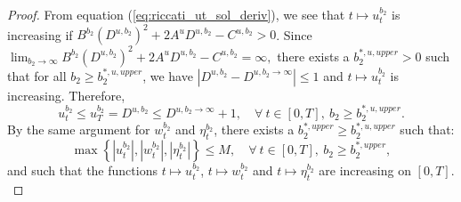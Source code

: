 \documentclass[11pt]{article}
\begin{document}
\begin{proof}
	From equation (\ref{eq:riccati_ut_sol_deriv}), we see that $t \mapsto u_t^{b_2}$ is increasing if $B^{b_2} (D^{u,b_2})^2 + 2 A^u D^{u,b_2} - C^{u,b_2} > 0$. Since 
	$\lim_{b_2 \to \infty} B^{b_2} (D^{u,b_2})^2 + 2 A^u D^{u,b_2} - C^{u,b_2} = \infty,$ there exists a $b_2^{*,u,upper} >0$ such that for all $b_2 \geq b_2^{*,u,upper}$, we have $|D^{u,b_2} -D^{u,b_2 \to \infty} | \leq 1$ and $t \mapsto u_t^{b_2}$ is increasing.
	Therefore,
	\begin{equation*}
	u_t^{b_2}\leq u_T^{b_2} = D^{u,b_2} \leq D^{u,b_2 \to \infty} + 1, \quad \forall \  t\in[0,T],\ b_2 \geq b_2^{*,u,upper}.
	\label{eq:u_t_bound}
	\end{equation*}
	By the same argument for $w_t^{b_2}$ and $\eta_t^{b_2}$, there exists a $b_2^{*,upper} \geq b_2^{*,u,upper}$ such that:
	\begin{equation}
	\max \left\{ \left\vert u_t^{b_2} \right\vert , \left\vert w_t^{b_2} \right\vert, \left\vert \eta_t^{b_2} \right\vert \right\} \leq M, \quad \forall \  t\in[0,T],\ b_2 \geq b_2^{*,upper},
	\label{eq:ut_wt_upper_bound_b2_infty}
	\end{equation}
	and such that the functions $t \mapsto u_t^{b_2}$, $t \mapsto w_t^{b_2}$ and $t \mapsto \eta_t^{b_2}$ are increasing on $[0,T]$. \\
	

\end{proof}
\end{document}
